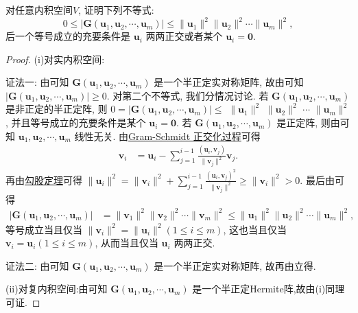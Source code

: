 \documentclass[../../main.tex]{subfiles}
\begin{document}
\begin{proposition}\label{proposition:例9.16}
对任意内积空间$V$,
证明下列不等式:
\[
0 \leq |\boldsymbol{G}(\boldsymbol{u}_1,\boldsymbol{u}_2,\cdots,\boldsymbol{u}_m)| \leq \|\boldsymbol{u}_1\|^2\|\boldsymbol{u}_2\|^2\cdots\|\boldsymbol{u}_m\|^2,
\]
后一个等号成立的充要条件是 $\boldsymbol{u}_i$ 两两正交或者某个 $\boldsymbol{u}_i = \boldsymbol{0}$.
\end{proposition}
\begin{proof}
(i)对实内积空间:

{\color{blue}证法一:}
由可知 $\boldsymbol{G}(\boldsymbol{u}_1,\boldsymbol{u}_2,\cdots,\boldsymbol{u}_m)$ 是一个半正定实对称矩阵, 故由可知 $|\boldsymbol{G}(\boldsymbol{u}_1,\boldsymbol{u}_2,\cdots,\boldsymbol{u}_m)| \geq 0$. 对第二个不等式, 我们分情况讨论. 若 $\boldsymbol{G}(\boldsymbol{u}_1,\boldsymbol{u}_2,\cdots,\boldsymbol{u}_m)$ 是非正定的半正定阵, 则 $0 = |\boldsymbol{G}(\boldsymbol{u}_1,\boldsymbol{u}_2,\cdots,\boldsymbol{u}_m)| \leq$   $\|\boldsymbol{u}_1\|^2$  $\|\boldsymbol{u}_2\|^2$ $\cdots$ $\|\boldsymbol{u}_m\|^2$, 并且等号成立的充要条件是某个 $\boldsymbol{u}_i = \boldsymbol{0}$. 若 $\boldsymbol{G}(\boldsymbol{u}_1,\boldsymbol{u}_2,\cdots,\boldsymbol{u}_m)$ 是正定阵, 则由可知 $\boldsymbol{u}_1,\boldsymbol{u}_2,\cdots,\boldsymbol{u}_m$ 线性无关. 由\hyperref[theorem:Gram-Schmidt正交化方法]{Gram-Schmidt 正交化过程}可得
\begin{align*}
\boldsymbol{v}_i &= \boldsymbol{u}_i - \sum_{j = 1}^{i - 1} \frac{(\boldsymbol{u}_i,\boldsymbol{v}_j)}{\|\boldsymbol{v}_j\|^2} \boldsymbol{v}_j.
\end{align*}
再由\hyperref[corollary:范数性质的相关推广-勾股定理]{勾股定理}可得 $\|\boldsymbol{u}_i\|^2 = \|\boldsymbol{v}_i\|^2 + \sum_{j = 1}^{i - 1} \frac{(\boldsymbol{u}_i,\boldsymbol{v}_j)^2}{\|\boldsymbol{v}_j\|^2} \geq \|\boldsymbol{v}_i\|^2 > 0$. 最后由可得
\begin{align*}
|\boldsymbol{G}(\boldsymbol{u}_1,\boldsymbol{u}_2,\cdots,\boldsymbol{u}_m)| &= \|\boldsymbol{v}_1\|^2\|\boldsymbol{v}_2\|^2\cdots\|\boldsymbol{v}_m\|^2 \leq \|\boldsymbol{u}_1\|^2\|\boldsymbol{u}_2\|^2\cdots\|\boldsymbol{u}_m\|^2,
\end{align*}
等号成立当且仅当 $\|\boldsymbol{v}_i\|^2 = \|\boldsymbol{u}_i\|^2 (1 \leq i \leq m)$, 这也当且仅当 $\boldsymbol{v}_i = \boldsymbol{u}_i (1 \leq i \leq m)$, 从而当且仅当 $\boldsymbol{u}_i$ 两两正交.

{\color{blue}证法二:}
由可知 $\boldsymbol{G}(\boldsymbol{u}_1,\boldsymbol{u}_2,\cdots,\boldsymbol{u}_m)$ 是一个半正定实对称矩阵, 故再由立得.

(ii)对复内积空间:由可知 $\boldsymbol{G}(\boldsymbol{u}_1,\boldsymbol{u}_2,\cdots,\boldsymbol{u}_m)$ 是一个半正定Hermite阵,故由(i)同理可证.
\end{proof}
\end{document}
